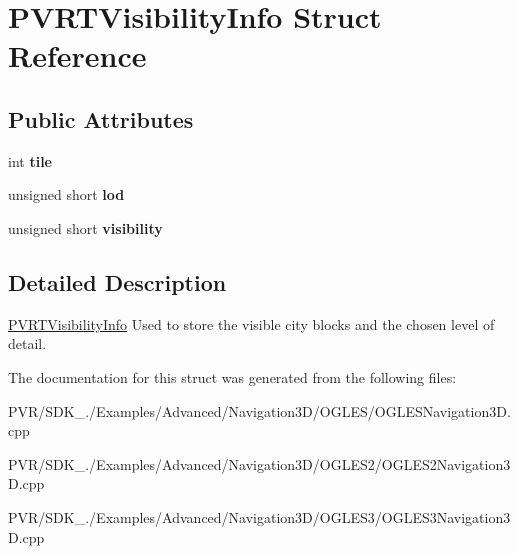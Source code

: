 \hypertarget{struct_p_v_r_t_visibility_info}{\section{P\+V\+R\+T\+Visibility\+Info Struct Reference}
\label{struct_p_v_r_t_visibility_info}
}
\subsection*{Public Attributes}
\begin{DoxyCompactItemize}
\item 
\hypertarget{struct_p_v_r_t_visibility_info_aab36e4605b8fad536113bd206cb83471}{int {\bfseries tile}}\label{struct_p_v_r_t_visibility_info_aab36e4605b8fad536113bd206cb83471}

\item 
\hypertarget{struct_p_v_r_t_visibility_info_a7aa0caf621859f79f0defe5700c38cee}{unsigned short {\bfseries lod}}\label{struct_p_v_r_t_visibility_info_a7aa0caf621859f79f0defe5700c38cee}

\item 
\hypertarget{struct_p_v_r_t_visibility_info_a2c4055eedad1bb73c1df0ee51d2acb6a}{unsigned short {\bfseries visibility}}\label{struct_p_v_r_t_visibility_info_a2c4055eedad1bb73c1df0ee51d2acb6a}

\end{DoxyCompactItemize}


\subsection{Detailed Description}


  \hyperlink{struct_p_v_r_t_visibility_info}{P\+V\+R\+T\+Visibility\+Info}  Used to store the visible city blocks and the chosen level of detail. 

The documentation for this struct was generated from the following files\+:\begin{DoxyCompactItemize}
\item 
P\+V\+R/\+S\+D\+K\+\_./\+Examples/\+Advanced/\+Navigation3\+D/\+O\+G\+L\+E\+S/O\+G\+L\+E\+S\+Navigation3\+D.\+cpp\item 
P\+V\+R/\+S\+D\+K\+\_./\+Examples/\+Advanced/\+Navigation3\+D/\+O\+G\+L\+E\+S2/O\+G\+L\+E\+S2\+Navigation3\+D.\+cpp\item 
P\+V\+R/\+S\+D\+K\+\_./\+Examples/\+Advanced/\+Navigation3\+D/\+O\+G\+L\+E\+S3/O\+G\+L\+E\+S3\+Navigation3\+D.\+cpp\end{DoxyCompactItemize}
